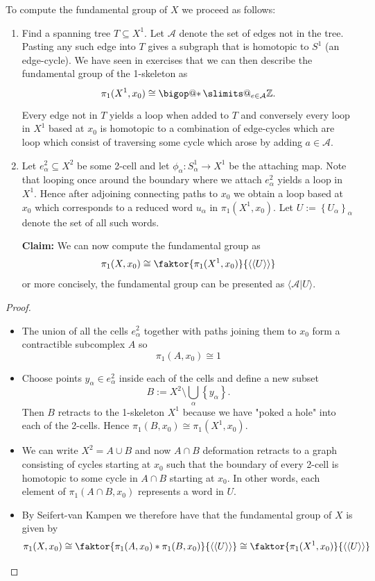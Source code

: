 \documentclass[11pt]{article}
\makeatletter
\newcommand{\defeq}{:=}
\DeclareRobustCommand\bigop[1]{%
  \mathop{\vphantom{\sum}\mathpalette\bigop@{#1}}\slimits@
}
\newcommand{\bigop@}[2]{%
  \vcenter{%
    \sbox\z@{$#1\sum$}%
    \hbox{\resizebox{\ifx#1\displaystyle.9\fi\dimexpr\ht\z@+\dp\z@}{!}{$\m@th#2$}}%
  }%
}
\newcommand{\bigast}{\DOTSB\bigop{\ast}}
\newcommand{\Z}{\mathbb{Z}}
\makeatother
\begin{document}
To compute the fundamental group of $X$ we proceed as follows:

\begin{enumerate}
	\item Find a spanning tree $T\subseteq X^1$.
		Let $\mathcal{A}$ denote the set of edges not in the tree.
		Pasting any such edge into $T$ gives a subgraph that is homotopic to $S^1$ (an edge-cycle).
		We have seen in exercises that we can then describe the fundamental group of the 1-skeleton as
		\[
			\pi_1(X^1, x_0)\cong \bigast_{e\in\mathcal{A}}\Z.
		\]
		Every edge not in $T$ yields a loop when added to $T$ and conversely every loop in $X^1$ based at $x_0$ is homotopic to a combination of edge-cycles which are loop which consist of traversing some cycle which arose by adding $a\in\mathcal{A}$.
	\item Let $e_\alpha^2\subseteq X^2$ be some 2-cell and let $\phi_\alpha : S_\alpha^1\to X^1$ be the attaching map.
		Note that looping once around the boundary where we attach $e_\alpha^2$ yields a loop in $X^1$.
		Hence after adjoining connecting paths to $x_0$ we obtain a loop based at $x_0$ which corresponds to a reduced word $u_\alpha$ in $\pi_1(X^1, x_0)$.
		Let $U\defeq\left\{U_\alpha\right\}_\alpha$ denote the set of all such words.

		\textbf{Claim: }We can now compute the fundamental group as
		\[
			\pi_1(X, x_0)\cong\faktor{\pi_1(X^1, x_0)}{\langle\langle U\rangle\rangle}
		\]
		or more concisely, the fundamental group can be presented as $\langle\mathcal{A} | U \rangle$.
\end{enumerate}

\begin{proof}
\begin{itemize}
	\item The union of all the cells $e_\alpha^2$ together with paths joining them to $x_0$ form a contractible subcomplex $A$ so
		\[
			\pi_1(A, x_0)\cong 1
		\]
	\item Choose points $y_\alpha\in e_\alpha^2$ inside each of the cells and define a new subset
		\[
			B\defeq X^2 \setminus \bigcup_\alpha\left\{y _\alpha\right\}.
		\]
		Then $B$ retracts to the 1-skeleton $X^1$ because we have "poked a hole" into each of the 2-cells.
		Hence $\pi_1(B, x_0)\cong \pi_1(X^1, x_0)$.
	\item We can write $X^2 = A\cup B$ and now $A\cap B$ deformation retracts to a graph consisting of cycles starting at $x_0$ such that the boundary of every 2-cell is homotopic to some cycle in $A \cap B$ starting at $x_0$.
		In other words, each element of $\pi_1(A\cap B, x_0)$ represents a word in $U$.
	\item By Seifert-van Kampen we therefore have that the fundamental group of $X$ is given by
		\[
			\pi_1(X, x_0)\cong\faktor{\pi_1(A, x_0)\ast\pi_1(B, x_0)}{\langle\langle U\rangle\rangle}\cong\faktor{\pi_1(X^1, x_0)}{\langle\langle U\rangle\rangle}
		\]
\end{itemize}
\end{proof}
\end{document}
